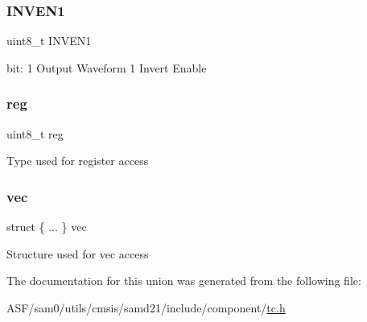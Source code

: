 \subsubsection{\texorpdfstring{INVEN1}{INVEN1}}
{\footnotesize\ttfamily uint8\+\_\+t I\+N\+V\+E\+N1}

bit\+: 1 Output Waveform 1 Invert Enable \mbox{\label{union_t_c___c_t_r_l_c___type_a9428adc9af4653a2050e2536b55dec8d}} 
\subsubsection{\texorpdfstring{reg}{reg}}
{\footnotesize\ttfamily uint8\+\_\+t reg}

Type used for register access \mbox{\label{union_t_c___c_t_r_l_c___type_ab04ae8a0916b6a81adb4b5a86cfc1bb8}} 
\subsubsection{\texorpdfstring{vec}{vec}}
{\footnotesize\ttfamily struct \{ ... \}   vec}

Structure used for vec access 

The documentation for this union was generated from the following file\+:\begin{DoxyCompactItemize}
\item 
A\+S\+F/sam0/utils/cmsis/samd21/include/component/\mbox{\hyperlink{utils_2cmsis_2samd21_2include_2component_2tc_8h}{tc.\+h}}\end{DoxyCompactItemize}
